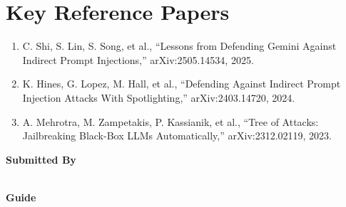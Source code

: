 \documentclass[11pt]{article}
\begin{document}
\section*{Key Reference Papers}
\begin{enumerate}
  \item C. Shi, S. Lin, S. Song, et al., ``Lessons from Defending Gemini Against Indirect Prompt Injections,'' arXiv:2505.14534, 2025.
  \item K. Hines, G. Lopez, M. Hall, et al., ``Defending Against Indirect Prompt Injection Attacks With Spotlighting,'' arXiv:2403.14720, 2024.
  \item A. Mehrotra, M. Zampetakis, P. Kassianik, et al., ``Tree of Attacks: Jailbreaking Black-Box LLMs Automatically,'' arXiv:2312.02119, 2023.
\end{enumerate}
\vspace{0.8em}
\noindent\textbf{Submitted By}\\
\seminarName\\
\seminarRoll

\vspace{0.6em}
\noindent\textbf{Guide}\\
\seminarGuide
\end{document}
